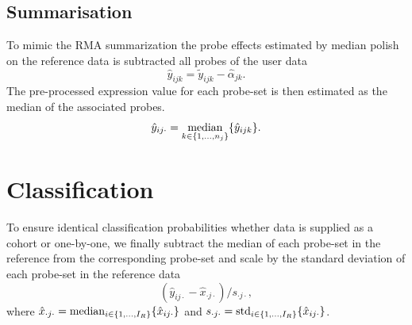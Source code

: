 \documentclass{article}
\begin{document}
\subsection{Summarisation}
To mimic the RMA summarization the probe effects estimated by median polish on the reference data is subtracted all probes of the user data
\begin{equation*}
   \hat{y}_{ijk} = \tilde{y}_{ijk} - \hat{\alpha}_{jk}.
\end{equation*}
The pre-processed expression value for each probe-set is then estimated as the median of the associated probes.
\begin{equation*}
   \hat{y}_{ij\cdot} = \operatorname*{median}_{k \in \{1,\dots,n_j \}} \{ \hat{y}_{ijk} \}.
\end{equation*}


\section{Classification}
To ensure identical classification probabilities whether data is supplied as a cohort or one-by-one, we finally subtract the median of each probe-set in the reference from the corresponding probe-set and scale by the standard deviation of each probe-set in the reference data
\begin{equation*}
  (\hat{y}_{ij\cdot} - \hat{x}_{\cdot j\cdot})/s_{\cdot j\cdot},
\end{equation*}
where
$\hat{x}_{\cdot j\cdot} = \operatorname*{median}_{i \in \{1,\dots,I_R \}} \{\hat{x}_{ij\cdot}\}$ and $s_{\cdot j\cdot} = \operatorname*{std}_{i \in \{1,\dots,I_R\}} \{\hat{x}_{ij\cdot}\}$.





{}

\end{document}
